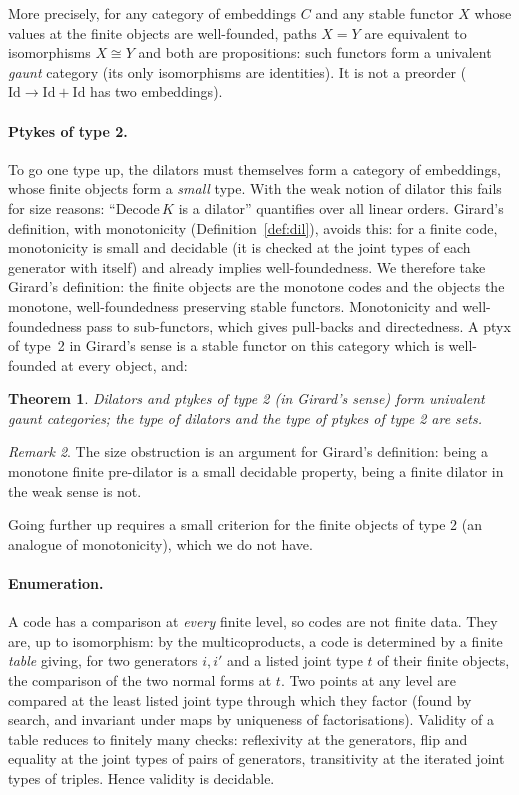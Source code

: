 \documentclass[11pt]{article}
\newtheorem{theorem}{Theorem}[section]
\theoremstyle{definition}
\theoremstyle{remark}
\newtheorem{remark}[theorem]{Remark}
\begin{document}
More precisely, for any category of embeddings $C$ and any stable functor
$X$ whose values at the finite objects are well-founded, paths $X=Y$ are
equivalent to isomorphisms $X\cong Y$ and both are propositions: such
functors form a univalent \emph{gaunt} category (its only isomorphisms are
identities). It is not a preorder ($\mathrm{Id}\to\mathrm{Id}+\mathrm{Id}$
has two embeddings).

\paragraph{Ptykes of type 2.} To go one type up, the dilators must
themselves form a category of embeddings, whose finite objects form a
\emph{small} type. With the weak notion of dilator this fails for size
reasons: ``$\mathrm{Decode}\,K$ is a dilator'' quantifies over all linear
orders. Girard's definition, with monotonicity
(Definition~\ref{def:dil}), avoids this: for a finite code, monotonicity is
small and decidable (it is checked at the joint types of each generator
with itself) and already implies well-foundedness. We therefore take
Girard's definition: the finite objects are the monotone codes and the
objects the monotone, well-foundedness preserving stable functors.
Monotonicity and well-foundedness pass to sub-functors, which gives
pull-backs and directedness. A ptyx of type~2 in Girard's sense is a stable
functor on this category which is well-founded at every object, and:

\begin{theorem}
Dilators and ptykes of type 2 (in Girard's sense) form univalent gaunt
categories; the type of dilators and the type of ptykes of type 2 are sets.
\end{theorem}

\begin{remark}
The size obstruction is an argument for Girard's definition: being a
monotone finite pre-dilator is a small decidable property, being a finite
dilator in the weak sense is not.
\end{remark}

Going further up requires a small criterion for the finite objects of type
2 (an analogue of monotonicity), which we do not have.

\paragraph{Enumeration.} A code has a comparison at \emph{every} finite
level, so codes are not finite data. They are, up to isomorphism: by the
multicoproducts, a code is determined by a finite \emph{table} giving, for
two generators $i,i'$ and a listed joint type $t$ of their finite objects,
the comparison of the two normal forms at $t$. Two points at any level are
compared at the least listed joint type through which they factor (found
by search, and invariant under maps by uniqueness of factorisations).
Validity of a table reduces to finitely many checks: reflexivity at the
generators, flip and equality at the joint types of pairs of generators,
transitivity at the iterated joint types of triples. Hence validity is
decidable.
\end{document}

